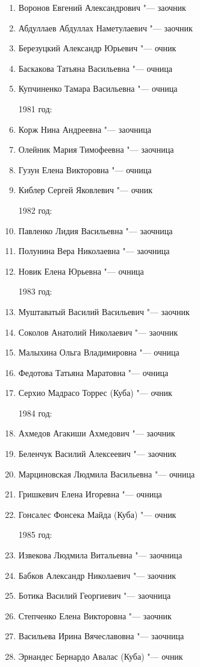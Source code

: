\begin{enumerate}[nosep]
{1980 год:}
	\item Воронов Евгений Александрович "--- заочник
	\item Абдуллаев Абдуллах Наметулаевич "--- заочник
	\item Березуцкий Александр Юрьевич "--- очник
	\item Баскакова Татьяна Васильевна "--- очница
	\item Купчиненко Тамара Васильевна "--- очница

{1981 год:}
	\item Корж Нина Андреевна "--- заочница
	\item Олейник Мария Тимофеевна "--- заочница
	\item Гузун Елена Викторовна "--- очница
	\item Киблер Сергей Яковлевич "--- очник

{1982 год:}
	\item Павленко Лидия Васильевна "--- заочница
	\item Полунина Вера Николаевна "--- заочница
	\item Новик Елена Юрьевна "--- очница

{1983 год:}
	\item Муштаватый Василий Васильевич "--- заочник
	\item Соколов Анатолий Николаевич "--- заочник
	\item Малыхина Ольга Владимировна "--- очница
	\item Федотова Татьяна Маратовна "--- очница
	\item Серхио Мадрасо Торрес (Куба) "--- очник

{1984 год:}
	\item Ахмедов Агакиши Ахмедович "--- заочник
	\item Беленчук Василий Алексеевич "--- заочник
	\item Марциновская Людмила Васильевна "--- очница
	\item Гришкевич Елена Игоревна "--- очница
	\item Гонсалес Фонсека Майда (Куба) "--- очник

{1985 год:}
	\item Извекова Людмила Витальевна "--- заочница
	\item Бабков Александр Николаевич "--- заочник
	\item Ботика Василий Георгиевич "--- заочница
	\item Степченко Елена Викторовна "--- заочник
	\item Васильева Ирина Вячеславовна "--- заочница
	\item Эрнандес Бернардо Авалас (Куба) "--- очник


\end{enumerate}
